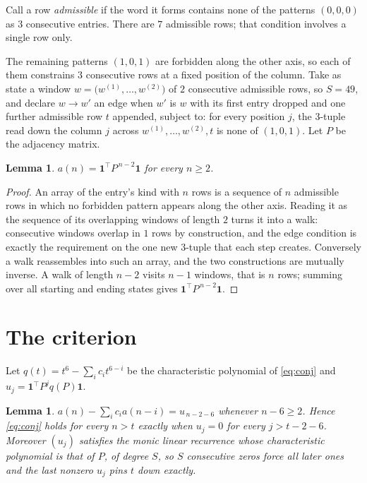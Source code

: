 \documentclass[11pt,a4paper]{article}
\theoremstyle{plain}
\newtheorem{lemma}[theorem]{Lemma}
\theoremstyle{definition}
\begin{document}
Call a row \emph{admissible} if the word it forms contains none of the patterns
$(0,0,0)$ as $3$ consecutive entries. There are $7$ admissible rows; that condition
involves a single row only.

The remaining patterns $(1,0,1)$ are forbidden along the other axis, so each of them
constrains $3$ consecutive rows at a fixed position of the column. Take as state a
window $w=\bigl(w^{(1)},\dots,w^{(2)}\bigr)$ of $2$ consecutive admissible
rows, so $S=49$, and declare $w\to w'$ an edge when $w'$ is $w$ with its first entry
dropped and one further admissible row $t$ appended, subject to: for every position
$j$, the $3$-tuple read down the column $j$ across $w^{(1)},\dots,w^{(2)},t$
is none of $(1,0,1)$. Let $P$ be the adjacency matrix.

\begin{lemma}\label{lem:walk}
$a(n)=\mathbf{1}^{\!\top}P^{\,n-2}\mathbf{1}$ for every $n\ge2$.
\end{lemma}

\begin{proof}
An array of the entry's kind with $n$ rows is a sequence of $n$ admissible rows in
which no forbidden pattern appears along the other axis. Reading it as the sequence of its
overlapping windows of length $2$ turns it into a walk: consecutive windows overlap in
$1$ rows by construction, and the edge condition is exactly the requirement on the one
new $3$-tuple that each step creates. Conversely a walk reassembles into such an array,
and the two constructions are mutually inverse. A walk of length $n-2$ visits $n-1$
windows, that is $n$ rows; summing over all starting and ending states gives
$\mathbf{1}^{\!\top}P^{\,n-2}\mathbf{1}$.
\end{proof}

\section{The criterion}

Let $q(t)=t^{6}-\sum_i c_i t^{6-i}$ be the characteristic polynomial of
\eqref{eq:conj} and $u_j=\mathbf{1}^{\!\top}P^{j}q(P)\mathbf{1}$.

\begin{lemma}\label{lem:crit}
$a(n)-\sum_i c_i a(n-i)=u_{\,n-2-6}$ whenever $n-6\ge2$. Hence
\eqref{eq:conj} holds for every $n>t$ exactly when $u_j=0$ for every
$j>t-2-6$. Moreover $(u_j)$ satisfies the monic linear recurrence whose
characteristic polynomial is that of $P$, of degree $S$, so $S$ consecutive zeros force all
later ones and the last nonzero $u_j$ pins $t$ down exactly.
\end{lemma}
\end{document}
